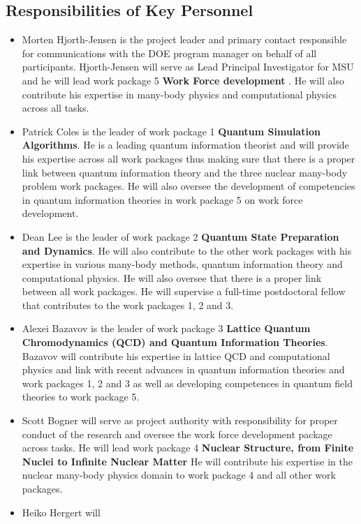 \documentclass[11pt]{article}
\begin{document}
\subsection{Responsibilities of Key Personnel}
\begin{itemize}
\item Morten Hjorth-Jensen is the project leader and primary contact responsible for communications with the DOE program manager on behalf of all participants. Hjorth-Jensen will serve as Lead Principal Investigator for MSU and he will lead work package 5 {\bf Work Force development} . He will also contribute his expertise in many-body physics and computational physics across all tasks.

\item Patrick Coles is the leader of work package 1 {\bf Quantum Simulation Algorithms}. He is a leading quantum information theorist and will provide his expertise across all work packages thus making sure that there is a proper link between quantum information theory and the three nuclear many-body problem work packages. He will also oversee the development of competencies in quantum information theories in work package 5 on work force development.
\item Dean Lee is the leader of work package 2 {\bf Quantum State Preparation and Dynamics}. He will also contribute to the other work packages with his expertise in various many-body methods, quantum information theory and computational physics.
He will also oversee that there is a proper link between all work packages. He will supervise a full-time postdoctoral fellow that contributes to the work packages 1, 2 and 3.  
\item Alexei Bazavov is the leader of work package 3 {\bf Lattice Quantum Chromodynamics (QCD) and Quantum Information Theories}. Bazavov will contribute his expertise in lattice QCD and computational physics and link with recent advances in quantum information theories and  work packages 1, 2 and 3 as well as developing competences in quantum field theories to  work package 5.
\item Scott Bogner will serve as project authority with responsibility for proper conduct of the research and oversee the work force development package across tasks. 
He will  lead work package 4 {\bf Nuclear Structure, from Finite Nuclei to Infinite Nuclear Matter}
He will
contribute his expertise in the nuclear many-body physics domain to work package  4 and all other work packages.
\item Heiko Hergert  will

\end{itemize}
\end{document}
